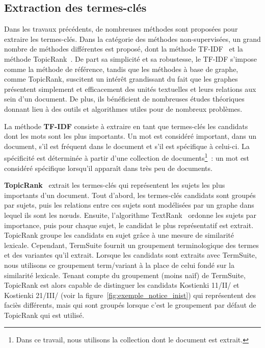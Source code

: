   \subsection{Extraction des termes-clés}
  \label{subsec:extraction_de_termes_cles}
    Dans les travaux précédents, de nombreuses méthodes sont proposées pour
    extraire les termes-clés. Dans la catégorie des méthodes non-supervisées, un
    grand nombre de méthodes différentes est proposé, dont la méthode
    TF-IDF~\cite{jones1972tfidf} et la méthode
    TopicRank~\cite{bougouin2013topicrank}. De part sa simplicité et sa
    robustesse, le TF-IDF s'impose comme la méthode de référence, tandis que les
    méthodes à base de graphe, comme TopicRank, suscitent un intérêt
    grandissant du fait que les graphes présentent simplement et efficacement
    des unités textuelles et leurs relations aux sein d'un document. De plus,
    ils bénéficient de nombreuses études théoriques donnant lieu à des outils et
    algorithmes utiles pour de nombreux problèmes.

    La méthode \textbf{TF-IDF} consiste à extraire en tant que termes-clés les
    candidats dont les mots sont les plus importants. Un mot est considéré
    important, dans un document, s'il est fréquent dans le document et s'il est
    spécifique à celui-ci. La spécificité est déterminée à partir d'une
    collection de documents\footnote{Dans ce travail, nous utilisons la
    collection dont le document est extrait.}~: un mot est considéré spécifique
    lorsqu'il apparaît dans très peu de documents.

    \textbf{TopicRank}~\cite{bougouin2013topicrank} extrait les termes-clés qui
    représentent les sujets les plus importants d'un document. Tout d'abord, les
    termes-clés candidats sont groupés par sujets, puis les relations entre ces
    sujets sont modélisées par un graphe dans lequel ils sont les n\oe{}uds.
    Ensuite, l'algorithme TextRank~\cite{mihalcea2004textrank} ordonne les
    sujets par importance, puis pour chaque sujet, le candidat le plus
    représentatif est extrait. TopicRank groupe les candidats en sujet grâce à
    une mesure de similarité lexicale. Cependant, TermSuite fournit un
    groupement terminologique des termes et des variantes qu'il extrait. Lorsque
    les candidats sont extraits avec TermSuite, nous utilisons ce groupement
    term/variant à la place de celui fondé sur la similarité lexicale. Tenant
    compte du groupement (moins naïf) de TermSuite, TopicRank est alors capable
    de distinguer les candidats \og{}Kostienki 11/II/\fg{} et \og{}Kostienki
    21/III/\fg{} (voir la figure~\ref{fig:exemple_notice_inist}) qui
    représentent des faciès différents, mais qui sont groupés lorsque c'est le
    groupement par défaut de TopicRank qui est utilisé.

